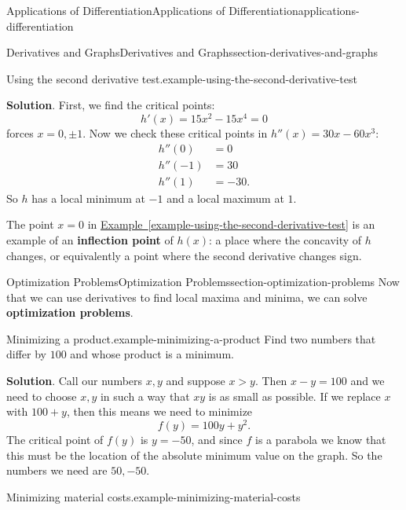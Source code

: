 \documentclass[oneside,10pt,]{book}
\newcommand{\terminology}[1]{\textbf{#1}}
\numberwithin{equation}{section}
\begin{document}
\begin{chapterptx}{Applications of Differentiation}{}{Applications of Differentiation}{}{}{applications-differentiation}
\begin{sectionptx}{Derivatives and Graphs}{}{Derivatives and Graphs}{}{}{section-derivatives-and-graphs}
\begin{example}{Using the second derivative test.}{example-using-the-second-derivative-test}
\par\smallskip%
\noindent\textbf{Solution}.\hypertarget{solution-77}{}\quad%
\hypertarget{p-353}{}%
First, we find the critical points:%
\begin{equation*}
h'(x) = 15x^{2} - 15x^{4} = 0
\end{equation*}
forces \(x=0,\pm1\). Now we check these critical points in \(h''(x) = 30x - 60x^{3}:\)%
\begin{align*}
h''(0) & = 0 \\
h''(-1) & = 30 \\
h''(1) & = -30. 
\end{align*}
So \(h\) has a local minimum at \(-1\) and a local maximum at \(1\).%
\end{example}
\hypertarget{p-354}{}%
The point \(x=0\) in \hyperref[example-using-the-second-derivative-test]{Example~\ref{example-using-the-second-derivative-test}} is an example of an \terminology{inflection point} of \(h(x)\): a place where the concavity of \(h\) changes, or equivalently a point where the second derivative changes sign.%
\end{sectionptx}
%
%
\typeout{************************************************}
\typeout{************************************************}
%
\begin{sectionptx}{Optimization Problems}{}{Optimization Problems}{}{}{section-optimization-problems}
\hypertarget{p-355}{}%
Now that we can use derivatives to find local maxima and minima, we can solve \terminology{optimization problems}.%
\begin{example}{Minimizing a product.}{example-minimizing-a-product}%
\hypertarget{p-356}{}%
Find two numbers that differ by \(100\) and whose product is a minimum.%
\par\smallskip%
\noindent\textbf{Solution}.\hypertarget{solution-78}{}\quad%
\hypertarget{p-357}{}%
Call our numbers \(x,y\) and suppose \(x > y\). Then \(x-y = 100\) and we need to choose \(x,y\) in such a way that \(xy\) is as small as possible. If we replace \(x\) with \(100+y\), then this means we need to minimize%
\begin{equation*}
f(y) = 100y + y^{2}.
\end{equation*}
The critical point of \(f(y)\) is \(y = -50\), and since \(f\) is a parabola we know that this must be the location of the absolute minimum value on the graph. So the numbers we need are \(50,-50\).%
\end{example}
\begin{example}{Minimizing material costs.}{example-minimizing-material-costs}%

\end{example}
\end{sectionptx}
\end{chapterptx}
\end{document}
